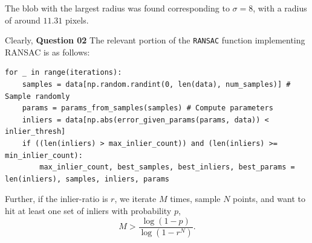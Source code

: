 \documentclass{article}[a4paper]
\begin{document}
	The blob with the largest radius was found corresponding to $\sigma = 8$, with a radius of around $11.31$ pixels.

	Clearly, 
    \textbf{Question 02} The relevant portion of the \lstinline|RANSAC| function implementing RANSAC is as follows:
	\begin{lstlisting}
for _ in range(iterations):
	samples = data[np.random.randint(0, len(data), num_samples)] # Sample randomly
	params = params_from_samples(samples) # Compute parameters
	inliers = data[np.abs(error_given_params(params, data)) < inlier_thresh]
	if ((len(inliers) > max_inlier_count)) and (len(inliers) >= min_inlier_count):
		max_inlier_count, best_samples, best_inliers, best_params = len(inliers), samples, inliers, params
	\end{lstlisting}

	Further, if the inlier-ratio is $r$, we iterate $M$ times, sample $N$ points, and want to hit at least one set of inliers with probability $p$, \[
		M > \dfrac{\log(1 - p)}{\log(1 - r^N)}.
	\]
\end{document}
